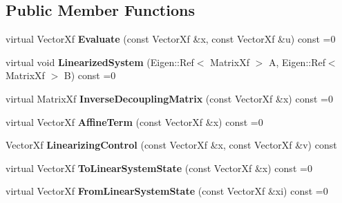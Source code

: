 \subsection*{Public Member Functions}
\begin{DoxyCompactItemize}
\item 
virtual Vector\+Xf {\bfseries Evaluate} (const Vector\+Xf \&x, const Vector\+Xf \&u) const =0\hypertarget{classilqgames_1_1_single_player_flat_system_a20c9491dcf6871772de086a11d30d5d7}{}\label{classilqgames_1_1_single_player_flat_system_a20c9491dcf6871772de086a11d30d5d7}

\item 
virtual void {\bfseries Linearized\+System} (Eigen\+::\+Ref$<$ Matrix\+Xf $>$ A, Eigen\+::\+Ref$<$ Matrix\+Xf $>$ B) const =0\hypertarget{classilqgames_1_1_single_player_flat_system_a3ee4cb1e9bdcff112bb89875420e88c3}{}\label{classilqgames_1_1_single_player_flat_system_a3ee4cb1e9bdcff112bb89875420e88c3}

\item 
virtual Matrix\+Xf {\bfseries Inverse\+Decoupling\+Matrix} (const Vector\+Xf \&x) const =0\hypertarget{classilqgames_1_1_single_player_flat_system_a3683c7873c019f02d8bfcaa0de1afa16}{}\label{classilqgames_1_1_single_player_flat_system_a3683c7873c019f02d8bfcaa0de1afa16}

\item 
virtual Vector\+Xf {\bfseries Affine\+Term} (const Vector\+Xf \&x) const =0\hypertarget{classilqgames_1_1_single_player_flat_system_a4ce7b06850b71df461800dccf9683a20}{}\label{classilqgames_1_1_single_player_flat_system_a4ce7b06850b71df461800dccf9683a20}

\item 
Vector\+Xf {\bfseries Linearizing\+Control} (const Vector\+Xf \&x, const Vector\+Xf \&v) const \hypertarget{classilqgames_1_1_single_player_flat_system_a4ca811c59babd68b0fdf9d9ed0298431}{}\label{classilqgames_1_1_single_player_flat_system_a4ca811c59babd68b0fdf9d9ed0298431}

\item 
virtual Vector\+Xf {\bfseries To\+Linear\+System\+State} (const Vector\+Xf \&x) const =0\hypertarget{classilqgames_1_1_single_player_flat_system_a594d67986244e731fb70ded660575020}{}\label{classilqgames_1_1_single_player_flat_system_a594d67986244e731fb70ded660575020}

\item 
virtual Vector\+Xf {\bfseries From\+Linear\+System\+State} (const Vector\+Xf \&xi) const =0\hypertarget{classilqgames_1_1_single_player_flat_system_a235d40a141ea4ae6ce39523aa0187d3e}{}\label{classilqgames_1_1_single_player_flat_system_a235d40a141ea4ae6ce39523aa0187d3e}


\end{DoxyCompactItemize}
